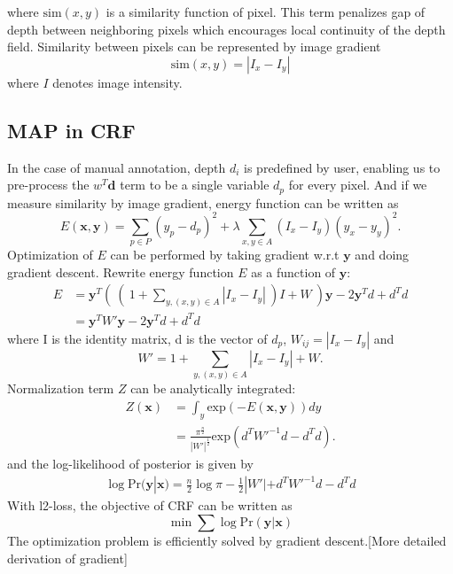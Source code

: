 \documentclass[10pt,twocolumn,letterpaper]{article}
\begin{document}
where $\text{sim}(x, y)$ is a similarity function of pixel. This term penalizes gap of depth between neighboring pixels which encourages local continuity of the depth field.
Similarity between pixels can be represented by image gradient
\begin{equation}
\text{sim}(x, y) = |I_x-I_y|
\end{equation}
where $I$ denotes image intensity.
\subsection{MAP in CRF}
In the case of manual annotation, depth $d_i$ is predefined by user, enabling us to pre-process the $w^T\mathbf{d}$ term to be a single variable $d_p$ for every pixel. And if we measure similarity by image gradient, energy function can be written as
\begin{equation}
E(\mathbf{x}, \mathbf{y}) = \sum_{p \in P} (y_p-d_p)^2 + \lambda \sum_{x, y \in A}(I_x-I_y)(y_x-y_y)^2.
\end{equation}
Optimization of $E$ can be performed by taking gradient w.r.t $\mathbf{y}$ and doing gradient descent. Rewrite energy function $E$ as a function of $\mathbf{y}$:
\begin{align}
E &= \mathbf{y}^T (\ (\ 1+\sum_{y, (x, y)\in A}|I_x-I_y|\ )I+W\ )\mathbf{y}-2\mathbf{y}^Td+d^Td 
\\ &= \mathbf{y}^T W'\mathbf{y}-2\mathbf{y}^Td+d^Td 
\end{align}
where I is the identity matrix, d is the vector of $d_p$, $W_{ij} = |I_x-I_y| $ and 
\begin{equation}
W' = 1+\sum_{y, (x, y)\in A}|I_x-I_y| + W.
\end{equation}
Normalization term $Z$ can be analytically integrated:
\begin{align}
Z(\mathbf{x}) &= \int_y \text{exp}(-E(\mathbf{x}, \mathbf{y})) dy
\\ &= \frac{\pi ^{\frac{n}{2}}}{|W'|^{\frac{1}{2}}}\text{exp}(d^TW'^{-1}d-d^Td).
\end{align}
and the log-likelihood of posterior is given by
\begin{align}
\log \text{Pr}(\mathbf{y}|\mathbf{x}) = \frac{n}{2}\log \pi - \frac{1}{2}|W'|+d^TW'^{-1}d-d^Td
\end{align}
With l2-loss, the objective of CRF can be written as
\begin{equation}
\min \sum \log \text{Pr}(\mathbf{y}| \mathbf{x})
\end{equation}
The optimization problem is efficiently solved by gradient descent.[More detailed derivation of gradient]
\end{document}
